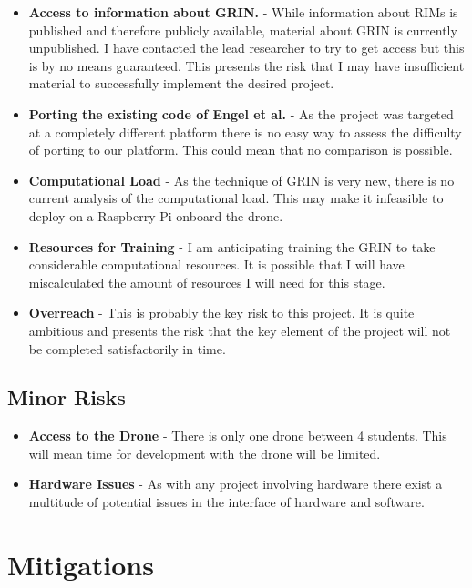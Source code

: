 \documentclass[]{../resources/final_report}
\begin{document}
\begin{itemize}
  \item \textbf{Access to information about GRIN.} - While information about RIMs is published and therefore publicly available, material about GRIN is currently unpublished. I have contacted the lead researcher to try to get access but this is by no means guaranteed. This presents the risk that I may have insufficient material to successfully implement the desired project.
  \item \textbf{Porting the existing code of Engel et al.} - As the project was targeted at a completely different platform there is no easy way to assess the difficulty of porting to our platform. This could mean that no comparison is possible.
  \item \textbf{Computational Load} - As the technique of GRIN is very new, there is no current analysis of the computational load. This may make it infeasible to deploy on a Raspberry Pi onboard the drone.
  \item \textbf{Resources for Training} - I am anticipating training the GRIN to take considerable computational resources. It is possible that I will have miscalculated the amount of resources I will need for this stage.
  \item \textbf{Overreach} - This is probably the key risk to this project. It is quite ambitious and presents the risk that the key element of the project will not be completed satisfactorily in time.
\end{itemize}


\subsection{Minor Risks}

\begin{itemize}
  \item \textbf{Access to the Drone} - There is only one drone between 4 students. This will mean time for development with the drone will be limited.
  \item \textbf{Hardware Issues} - As with any project involving hardware there exist a multitude of potential issues in the interface of hardware and software.
\end{itemize}

\pagebreak

\section{Mitigations}
\end{document}
